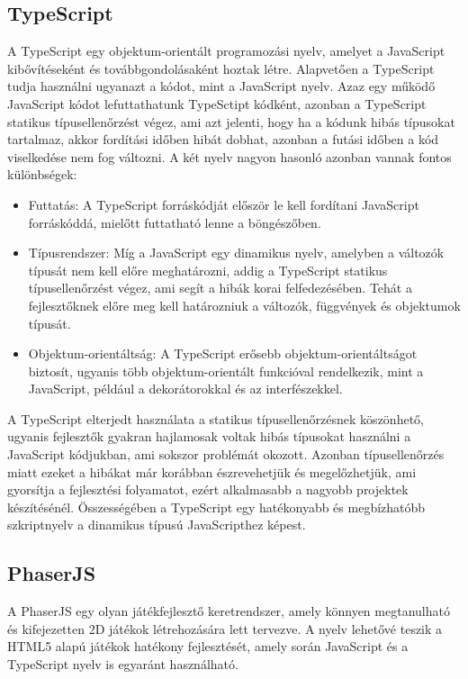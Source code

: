 \documentclass[12pt, a4paper]{report}
\theoremstyle{definition}
\begin{document}
	\subsection{TypeScript}
	A TypeScript egy objektum-orientált programozási nyelv, amelyet a JavaScript kibővítéseként és továbbgondolásaként hoztak létre. Alapvetően a TypeScript tudja használni ugyanazt a kódot, mint a JavaScript nyelv. Azaz egy működő JavaScript kódot lefuttathatunk TypeSctipt kódként, azonban a TypeScript statikus típusellenőrzést végez, ami azt jelenti, hogy ha a kódunk hibás típusokat tartalmaz, akkor fordítási időben hibát dobhat, azonban a futási időben a kód viselkedése nem fog változni.
	A két nyelv nagyon hasonló azonban vannak fontos különbségek:
	\begin{itemize}
		\item Futtatás: A TypeScript forráskódját először le kell fordítani JavaScript forráskóddá, mielőtt futtatható lenne a böngészőben.
		\item Típusrendszer: Míg a JavaScript egy dinamikus nyelv, amelyben a változók típusát nem kell előre meghatározni, addig a TypeScript statikus típusellenőrzést végez, ami segít a hibák korai felfedezésében. Tehát a fejlesztőknek előre meg kell határozniuk a változók, függvények és objektumok típusát.
		\item Objektum-orientáltság: A TypeScript erősebb objektum-orientáltságot biztosít, ugyanis több objektum-orientált funkcióval rendelkezik, mint a JavaScript, például a dekorátorokkal és az interfészekkel.
	\end{itemize}
	A TypeScript elterjedt használata a statikus típusellenőrzésnek köszönhető, ugyanis fejlesztők gyakran hajlamosak voltak hibás típusokat használni a JavaScript kódjukban, ami sokszor problémát okozott. Azonban típusellenőrzés miatt ezeket a hibákat már korábban észrevehetjük és megelőzhetjük, ami gyorsítja a fejlesztési folyamatot, ezért alkalmasabb a nagyobb projektek készítésénél. Összességében a TypeScript egy hatékonyabb és megbízhatóbb szkriptnyelv a dinamikus típusú JavaScripthez képest. 
	
	\subsection{PhaserJS}
	A PhaserJS egy olyan játékfejlesztő keretrendszer, amely könnyen megtanulható és kifejezetten 2D játékok létrehozására lett tervezve. A nyelv lehetővé teszik a HTML5 alapú játékok hatékony fejlesztését, amely során JavaScript és a TypeScript nyelv is egyaránt használható. 
	
\end{document}
